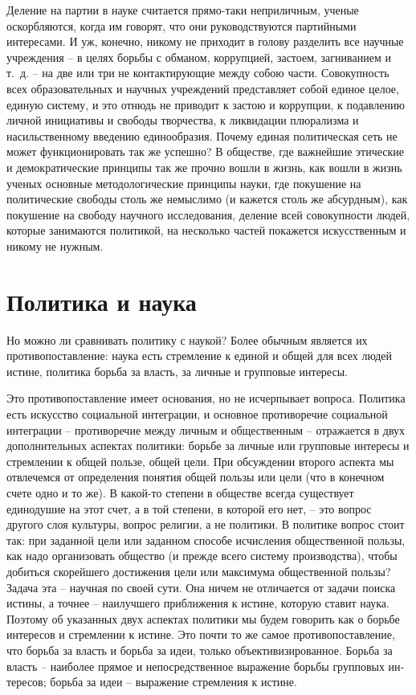 \documentclass{book}
\begin{document}
Деление на партии в науке считается прямо-таки неприличным, ученые оскорбляются, когда им говорят, что они руководству­ются партийными интересами. И уж, конечно, никому не приходит в голову разделить все научные учреждения -- в целях борьбы с обманом, коррупцией, застоем, загниванием и т.~д. -- на две или три не контактирующие между собою части. Совокупность всех образовательных и научных учреждений пред­ставляет собой единое целое, единую систему, и это отнюдь не приводит к застою и коррупции, к подавлению личной ини­циативы и свободы творчества, к ликвидации плюрализма и насильственному введению единообразия. Почему единая поли­тическая сеть не может функционировать так же успешно? В обществе, где важнейшие этические и демократические прин­ципы так же прочно вошли в жизнь, как вошли в жизнь ученых основные методологические принципы науки, где покушение на политические свободы столь же немыслимо (и кажется столь же абсурдным), как покушение на свободу научного ис­следования, деление всей совокупности людей, 
которые занима­ются политикой, на несколько частей покажется искусственным и никому не нужным.



\section{Политика и наука}

Но можно ли сравнивать политику с наукой? Более обычным является их противопоставление: наука есть стремление к единой и общей для всех людей истине, политика борьба за власть, за личные и групповые интересы.

Это противопоставление имеет основания, но не исчерпывает вопроса. Политика есть искусство социальной интеграции, и основное противоречие социальной интеграции -- противоречие между личным и общественным -- отражается в двух дополнительных аспектах политики: борьбе за личные или групповые интересы и стремлении к общей пользе, общей цели. При обсуждении второго аспекта мы отвлечемся от определения понятия общей пользы или цели (что в конечном счете одно и то же). В какой-то степени в обществе всегда существует единодушие на этот счет, а в той степени, в которой его нет, -- это вопрос другого слоя культуры, вопрос религии, а не политики. В политике вопрос стоит так: при заданной цели или заданном способе исчисления общественной пользы, как надо организовать общество (и прежде всего систему производства), чтобы добиться скорейшего достижения цели или максимума общественной пользы? Задача эта -- научная по своей сути. Она ничем не отличается от задачи поиска истины, а точнее -- наилучшего приближения к истине, 
которую ставит наука. Поэтому об указанных двух аспектах политики мы будем говорить как о борьбе интересов  и стремлении к истине.  Это почти то же самое противопоставление, что борьба за власть и борьба за идеи, только объективизированное. Борьба за власть -- наиболее прямое и непосредственное выражение борьбы групповых ин­тересов; борьба за идеи -- выражение стремления к истине.
\end{document}
